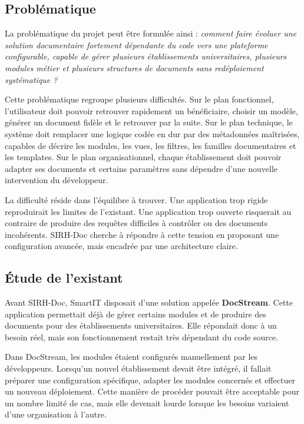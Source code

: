 \subsection{Problématique}

La problématique du projet peut être formulée ainsi : \textit{comment faire évoluer une solution documentaire fortement dépendante du code vers une plateforme configurable, capable de gérer plusieurs établissements universitaires, plusieurs modules métier et plusieurs structures de documents sans redéploiement systématique ?}

Cette problématique regroupe plusieurs difficultés. Sur le plan fonctionnel, l'utilisateur doit pouvoir retrouver rapidement un bénéficiaire, choisir un modèle, générer un document fidèle et le retrouver par la suite. Sur le plan technique, le système doit remplacer une logique codée en dur par des métadonnées maîtrisées, capables de décrire les modules, les vues, les filtres, les familles documentaires et les templates. Sur le plan organisationnel, chaque établissement doit pouvoir adapter ses documents et certains paramètres sans dépendre d'une nouvelle intervention du développeur.

La difficulté réside dans l'équilibre à trouver. Une application trop rigide reproduirait les limites de l'existant. Une application trop ouverte risquerait au contraire de produire des requêtes difficiles à contrôler ou des documents incohérents. SIRH-Doc cherche à répondre à cette tension en proposant une configuration avancée, mais encadrée par une architecture claire.

\subsection{Étude de l'existant}

Avant SIRH-Doc, SmartIT disposait d'une solution appelée \textbf{DocStream}. Cette application permettait déjà de gérer certains modules et de produire des documents pour des établissements universitaires. Elle répondait donc à un besoin réel, mais son fonctionnement restait très dépendant du code source.

Dans DocStream, les modules étaient configurés manuellement par les développeurs. Lorsqu'un nouvel établissement devait être intégré, il fallait préparer une configuration spécifique, adapter les modules concernés et effectuer un nouveau déploiement. Cette manière de procéder pouvait être acceptable pour un nombre limité de cas, mais elle devenait lourde lorsque les besoins variaient d'une organisation à l'autre.

